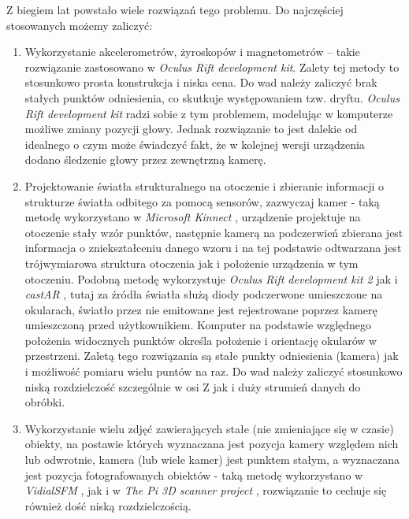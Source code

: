 Z biegiem lat powstało wiele rozwiązań tego problemu. Do najczęściej stosowanych możemy zaliczyć:
\begin{enumerate}
 \item 
 Wykorzystanie akcelerometrów, żyroskopów i magnetometrów -- 
takie rozwiązanie zastosowano w \textit{Oculus Rift development kit}. Zalety tej metody to stosunkowo
prosta konstrukcja i niska cena.
Do wad należy zaliczyć brak stałych punktów odniesienia, co skutkuje występowaniem tzw. dryftu.
\textit{Oculus Rift development kit} radzi sobie z tym problemem, modelując w komputerze możliwe zmiany pozycji głowy.
Jednak rozwiązanie to jest dalekie od idealnego o czym może świadczyć fakt, że w kolejnej wersji 
urządzenia dodano śledzenie głowy przez zewnętrzną kamerę.

\item \label{itm:second_method}
 Projektowanie światła strukturalnego na otoczenie i zbieranie informacji o strukturze 
 światła odbitego za pomocą sensorów, zazwyczaj kamer - taką metodę wykorzystano w \textit{Microsoft Kinnect} \cite{bib:MicrosoftKinect},
 urządzenie projektuje na otoczenie stały wzór punktów, następnie kamerą na podczerwień
 zbierana jest informacja o zniekształceniu danego wzoru i na tej podstawie odtwarzana jest 
 trójwymiarowa struktura otoczenia jak i położenie urządzenia w tym otoczeniu.
 Podobną metodę wykorzystuje \textit{Oculus Rift development kit 2} \cite{bib:OculusRiftDK2} jak i 
 \textit{castAR} \cite{bib:castAR}, tutaj za źródła światła służą diody podczerwone umieszczone na okularach,
 światło przez nie emitowane jest rejestrowane poprzez kamerę umieszczoną przed użytkownikiem.
 Komputer na podstawie względnego położenia widocznych punktów określa położenie i orientację
 okularów w przestrzeni.
 Zaletą tego rozwiązania są stałe punkty odniesienia (kamera) jak i możliwość pomiaru wielu puntów na raz.
 Do wad należy zaliczyć stosunkowo niską rozdzielczość szczególnie w osi Z jak i duży strumień danych do obróbki.

\item
 Wykorzystanie wielu zdjęć zawierających stałe (nie zmieniające się w czasie) obiekty, na postawie których wyznaczana jest pozycja kamery względem nich
  lub odwrotnie, kamera (lub wiele kamer) jest punktem stałym, a wyznaczana jest pozycja fotografowanych obiektów -   
 taką metodę wykorzystano w \textit{VidialSFM} \cite{bib:VisualSFM}, jak i w \textit{The Pi 3D scanner project} \cite{bib:pi3dscan}, 
 rozwiązanie to cechuje się również dość niską rozdzielczością.
 
\end{enumerate}
 

